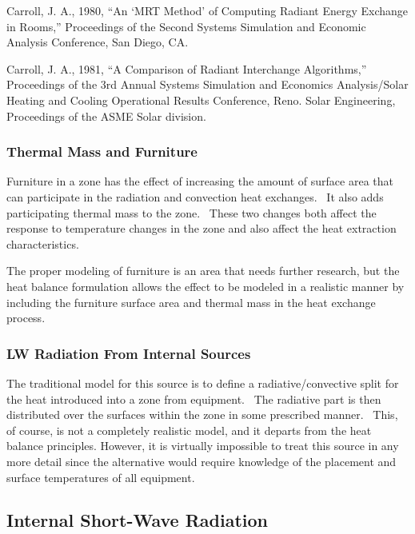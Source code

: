 Carroll, J. A., 1980, ``An `MRT Method' of Computing Radiant Energy Exchange in Rooms,'' Proceedings of the Second Systems Simulation and Economic Analysis Conference, San Diego, CA.

Carroll, J. A., 1981, ``A Comparison of Radiant Interchange Algorithms,'' Proceedings of the 3rd Annual Systems Simulation and Economics Analysis/Solar Heating and Cooling Operational Results Conference, Reno. Solar Engineering, Proceedings of the ASME Solar division.


\subsubsection{Thermal Mass and Furniture}\label{thermal-mass-and-furniture}

Furniture in a zone has the effect of increasing the amount of surface area that can participate in the radiation and convection heat exchanges.~ It also adds participating thermal mass to the zone.~ These two changes both affect the response to temperature changes in the zone and also affect the heat extraction characteristics.

The proper modeling of furniture is an area that needs further research, but the heat balance formulation allows the effect to be modeled in a realistic manner by including the furniture surface area and thermal mass in the heat exchange process.

\subsubsection{LW Radiation From Internal Sources}\label{lw-radiation-from-internal-sources}

The traditional model for this source is to define a radiative/convective split for the heat introduced into a zone from equipment.~ The radiative part is then distributed over the surfaces within the zone in some prescribed manner.~ This, of course, is not a completely realistic model, and it departs from the heat balance principles. However, it is virtually impossible to treat this source in any more detail since the alternative would require knowledge of the placement and surface temperatures of all equipment.

\subsection{Internal Short-Wave Radiation}\label{internal-short-wave-radiation}

